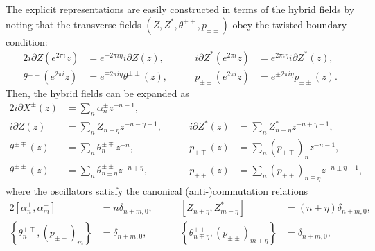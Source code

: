 \documentclass[a4paper,seceq,preprint]{ptptex}
\begin{document}
The explicit representations are easily constructed in terms of 
the hybrid fields by noting that
the transverse fields $(Z,Z^*,\theta^{\pm\pm},p_{\pm\pm})$
obey the twisted boundary condition:
\begin{alignat}{2}
   i\partial Z(e^{2\pi i}z)&=e^{-2\pi i\eta}i\partial Z(z),&\qquad
   i\partial Z^*(e^{2\pi i}z)&=e^{2\pi i\eta}i\partial Z^*(z),
\nonumber\\
   \theta^{\pm\pm}(e^{2\pi i}z)&=e^{\mp 2\pi i\eta}\theta^{\pm\pm}(z),
&\qquad
   p_{\pm\pm}(e^{2\pi i}z)&=e^{\pm 2\pi i\eta}p_{\pm\pm}(z).
\label{twstbc}
\end{alignat}
Then, the hybrid fields can be expanded as
\begin{alignat}{2}
   i\partial X^\pm(z)&=\sum_n\alpha^\pm_nz^{-n-1},&&\nonumber\\
  i\partial Z(z)&=\sum_nZ_{n+\eta}z^{-n-\eta-1},&\qquad
  i\partial Z^*(z)&=\sum_nZ^*_{n-\eta}z^{-n+\eta-1},
\nonumber\\
  \theta^{\pm\mp}(z)&=\sum_n\theta^{\pm\mp}_nz^{-n},&\qquad
  p_{\pm\mp}(z)&=\sum_n(p_{\pm\mp})_nz^{-n-1},\nonumber\\
  \theta^{\pm\pm}(z)&=\sum_n\theta^{\pm\pm}_{n\pm\eta}z^{-n\mp\eta},
&\qquad
  p_{\pm\pm}(z)&=\sum_n(p_{\pm\pm})_{n\mp\eta}z^{-n\pm\eta-1},
\label{ffr}
\end{alignat}
where the oscillators satisfy the canonical 
(anti-)commutation relations
\begin{alignat}{2}
  \left[\alpha^+_n,\alpha^-_m\right]&=n\delta_{n+m,0},&\qquad
  \left[Z_{n+\eta},Z^*_{m-\eta}\right]&=(n+\eta)\delta_{n+m,0},
\nonumber\\
  \left\{\theta^{\pm\mp}_n,(p_{\pm\mp})_m\right\}&=\delta_{n+m,0},&\qquad
  \left\{\theta^{\pm\pm}_{n\mp\eta},(p_{\pm\pm})_{m\pm\eta}\right\}&
=\delta_{n+m,0},
\label{oscccr}
\end{alignat}
\end{document}
